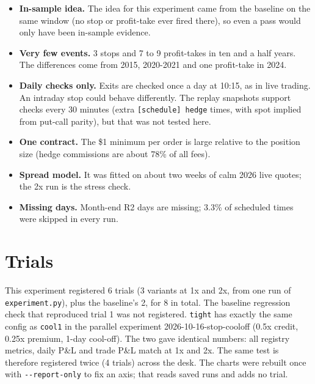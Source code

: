\documentclass{article}
\begin{document}
\begin{itemize}

\item \textbf{In-sample idea.} The idea for this experiment came from the baseline on the same window (no stop or profit-take ever fired there), so even a pass would only have been in-sample evidence.

\item \textbf{Very few events.} 3 stops and 7 to 9 profit-takes in ten and a half years. The differences come from 2015, 2020-2021 and one profit-take in 2024.

\item \textbf{Daily checks only.} Exits are checked once a day at 10:15, as in live trading. An intraday stop could behave differently. The replay snapshots support checks every 30 minutes (extra \texttt{[schedule] hedge} times, with spot implied from put-call parity), but that was not tested here.

\item \textbf{One contract.} The \$1 minimum per order is large relative to the position size (hedge commissions are about 78\% of all fees).

\item \textbf{Spread model.} It was fitted on about two weeks of calm 2026 live quotes; the 2x run is the stress check.

\item \textbf{Missing days.} Month-end R2 days are missing; 3.3\% of scheduled times were skipped in every run.

\end{itemize}

\section{Trials}

This experiment registered 6 trials (3 variants at 1x and 2x, from one run of \texttt{experiment.\allowbreak{}py}), plus the baseline's 2, for 8 in total. The baseline regression check that reproduced trial 1 was not registered. \texttt{tight} has exactly the same config as \texttt{cool1} in the parallel experiment 2026-10-16-stop-cooloff (0.5x credit, 0.25x premium, 1-day cool-off). The two gave identical numbers: all registry metrics, daily P\&L and trade P\&L match at 1x and 2x. The same test is therefore registered twice (4 trials) across the desk. The charts were rebuilt once with \texttt{-\allowbreak{}-\allowbreak{}report-\allowbreak{}only} to fix an axis; that reads saved runs and adds no trial.
\end{document}
